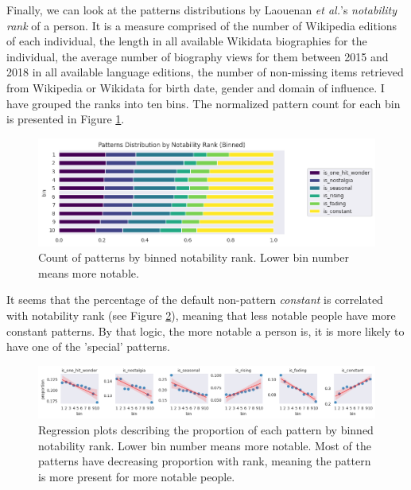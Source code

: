\documentclass[titlepage]{article}
\newcommand{\const}{\textit{constant}\xspace}
\begin{document}
Finally, we can look at the patterns distributions by Laouenan \textit{et al.}'s \cite{laouenan_cross-verified_2022} \textit{notability rank} of a person. It is a measure comprised of the number of Wikipedia editions of each individual, the length in all available Wikidata biographies for the individual, the average number of biography views for them between 2015 and 2018 in all available language editions, the number of non-missing items retrieved from Wikipedia or Wikidata for birth date, gender and domain of influence. I have grouped the ranks into ten bins. The normalized pattern count for each bin is presented in Figure \ref{fig:notability}.

\begin{figure}[H]
    \centering
    \includegraphics[width=0.8\linewidth]{figures/notability.png}
    \caption{Count of patterns by binned notability rank. Lower bin number means more notable.}
    \label{fig:notability}
\end{figure}

It seems that the percentage of the default non-pattern \const is correlated with notability rank (see Figure \ref{fig:notability-reg}), meaning that less notable people have more constant patterns. By that logic, the more notable a person is, it is more likely to have one of the 'special' patterns.

\begin{figure}[H]
    \centering
    \includegraphics[width=\linewidth]{figures/notability_reg.png}
    \caption{Regression plots describing the proportion of each pattern by binned notability rank. Lower bin number means more notable. Most of the patterns have decreasing proportion with rank, meaning the pattern is more present for more notable people.}
    \label{fig:notability-reg}
\end{figure}
\end{document}
